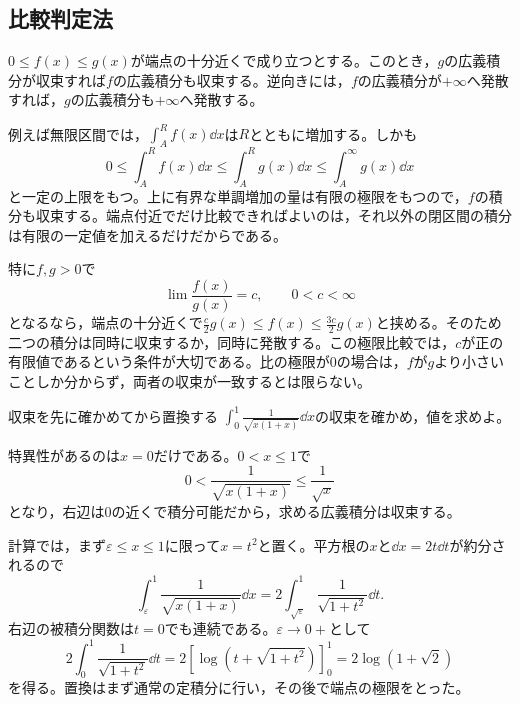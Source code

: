 \subsection{比較判定法}

$0\leq f(x)\leq g(x)$が端点の十分近くで成り立つとする。このとき，$g$の広義積分が収束すれば$f$の広義積分も収束する。逆向きには，$f$の広義積分が$+\infty$へ発散すれば，$g$の広義積分も$+\infty$へ発散する。

例えば無限区間では，$\int_A^R f(x)\dd x$は$R$とともに増加する。しかも
\[
 0\leq\int_A^Rf(x)\dd x\leq\int_A^Rg(x)\dd x
 \leq\int_A^{\infty}g(x)\dd x
\]
と一定の上限をもつ。上に有界な単調増加の量は有限の極限をもつので，$f$の積分も収束する。端点付近でだけ比較できればよいのは，それ以外の閉区間の積分は有限の一定値を加えるだけだからである。

特に$f,g>0$で
\[
 \lim\frac{f(x)}{g(x)}=c,\qquad0<c<\infty
\]
となるなら，端点の十分近くで$\frac c2g(x)\leq f(x)\leq\frac{3c}{2}g(x)$と挟める。そのため二つの積分は同時に収束するか，同時に発散する。この極限比較では，$c$が正の有限値であるという条件が大切である。比の極限が$0$の場合は，$f$が$g$より小さいことしか分からず，両者の収束が一致するとは限らない。

\begin{example}{収束を先に確かめてから置換する}
$\int_0^1\frac1{\sqrt{x(1+x)}}\dd x$の収束を確かめ，値を求めよ。
\end{example}

特異性があるのは$x=0$だけである。$0<x\leq1$で
\[
 0<\frac1{\sqrt{x(1+x)}}\leq\frac1{\sqrt{x}}
\]
となり，右辺は$0$の近くで積分可能だから，求める広義積分は収束する。

計算では，まず$\varepsilon\leq x\leq1$に限って$x=t^2$と置く。平方根の$x$と$\dd x=2t\dd t$が約分されるので
\[
 \int_{\varepsilon}^1\frac1{\sqrt{x(1+x)}}\dd x
 =2\int_{\sqrt{\varepsilon}}^1\frac1{\sqrt{1+t^2}}\dd t.
\]
右辺の被積分関数は$t=0$でも連続である。$\varepsilon\to0+$として
\[
 2\int_0^1\frac1{\sqrt{1+t^2}}\dd t
 =2\left[\log\left(t+\sqrt{1+t^2}\right)\right]_0^1
 =2\log(1+\sqrt2)
\]
を得る。置換はまず通常の定積分に行い，その後で端点の極限をとった。

